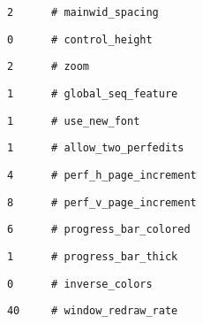    \begin{verbatim}
      2      # mainwid_spacing
   \end{verbatim}

   \begin{verbatim}
      0      # control_height
   \end{verbatim}

   \begin{verbatim}
      2      # zoom
   \end{verbatim}

   \begin{verbatim}
      1      # global_seq_feature
   \end{verbatim}

   \begin{verbatim}
      1      # use_new_font
   \end{verbatim}

   \begin{verbatim}
      1      # allow_two_perfedits
   \end{verbatim}

   \begin{verbatim}
      4      # perf_h_page_increment
   \end{verbatim}

   \begin{verbatim}
      8      # perf_v_page_increment
   \end{verbatim}

   \begin{verbatim}
      6      # progress_bar_colored
   \end{verbatim}

   \begin{verbatim}
      1      # progress_bar_thick
   \end{verbatim}

   \begin{verbatim}
      0      # inverse_colors
   \end{verbatim}

   \begin{verbatim}
      40     # window_redraw_rate
   \end{verbatim}

